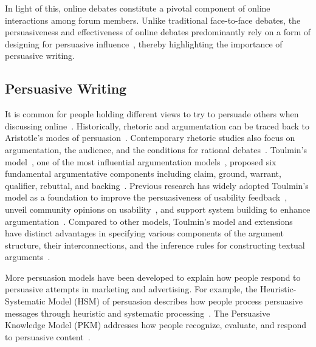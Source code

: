 In light of this, online debates constitute a pivotal component of online interactions among forum members. Unlike traditional face-to-face debates, the persuasiveness and effectiveness of online debates predominantly rely on a form of designing for persuasive influence~\cite{lc_designing_2021, lc_designing_2022}, thereby highlighting the importance of persuasive writing.


\subsection{Persuasive Writing}
It is common for people holding different views to try to persuade others when discussing online~\cite{xia_persua_2022,tan_winning_2016}. Historically, rhetoric and argumentation can be traced back to Aristotle's modes of persuasion~\cite{wang_argulens_2020}. Contemporary rhetoric studies also focus on argumentation, the audience, and the conditions for rational debates~\cite{herrick_history_2020}. Toulmin's model~\cite{toulmin_uses_2003}, one of the most influential argumentation models~\cite{wang_argulens_2020}, proposed six fundamental argumentative components including claim, ground, warrant, qualifier, rebuttal, and backing~\cite{wang_argulens_2020,bentahar_taxonomy_2010,toulmin_uses_2003}. Previous research has widely adopted Toulmin's model as a foundation to improve the persuasiveness of usability feedback~\cite{norgaard_evaluating_2008}, unveil community opinions on usability~\cite{wang_argulens_2020}, and support system building to enhance argumentation~\cite{zhang_using_2016,wambsganss_modeling_2022}. Compared to other models, Toulmin's model and extensions have distinct advantages in specifying various components of the argument structure, their interconnections, and the inference rules for constructing textual arguments~\cite{bentahar_taxonomy_2010}.

More persuasion models have been developed to explain how people respond to persuasive attempts in marketing and advertising. For example, the Heuristic-Systematic Model (HSM) of persuasion describes how people process persuasive messages through heuristic and systematic processing~\cite{reimer_use_2004}. The Persuasive Knowledge Model (PKM) addresses how people recognize, evaluate, and respond to persuasive content~\cite{friestad_persuasion_1994}.

